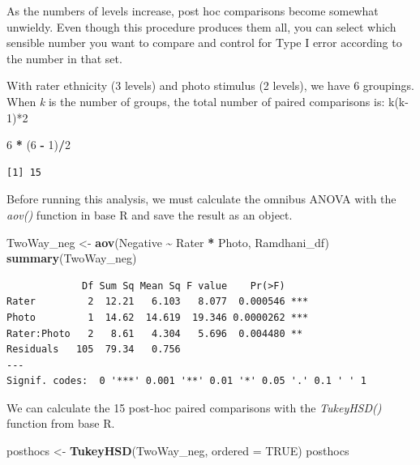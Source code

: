 \documentclass[
  11pt,
]{book}
\newenvironment{Shaded}{\begin{snugshade}}{\end{snugshade}}
\newcommand{\AttributeTok}[1]{\textcolor[rgb]{0.27,0.27,0.27}{#1}}
\newcommand{\ConstantTok}[1]{\textcolor[rgb]{0.37,0.37,0.37}{#1}}
\newcommand{\DecValTok}[1]{\textcolor[rgb]{0.06,0.06,0.06}{#1}}
\newcommand{\FunctionTok}[1]{\textcolor[rgb]{0.27,0.27,0.27}{\textbf{#1}}}
\newcommand{\NormalTok}[1]{#1}
\newcommand{\OtherTok}[1]{\textcolor[rgb]{0.37,0.37,0.37}{#1}}
\newcommand{\SpecialCharTok}[1]{\textcolor[rgb]{0.43,0.43,0.43}{\textbf{#1}}}
\begin{document}
As the numbers of levels increase, post hoc comparisons become somewhat unwieldy. Even though this procedure produces them all, you can select which sensible number you want to compare and control for Type I error according to the number in that set.

With rater ethnicity (3 levels) and photo stimulus (2 levels), we have 6 groupings. When \emph{k} is the number of groups, the total number of paired comparisons is: k(k-1)*2

\begin{Shaded}
\begin{Highlighting}[]
\DecValTok{6} \SpecialCharTok{*}\NormalTok{ (}\DecValTok{6} \SpecialCharTok{{-}} \DecValTok{1}\NormalTok{)}\SpecialCharTok{/}\DecValTok{2}
\end{Highlighting}
\end{Shaded}

\begin{verbatim}
[1] 15
\end{verbatim}

Before running this analysis, we must calculate the omnibus ANOVA with the \emph{aov()} function in base R and save the result as an object.

\begin{Shaded}
\begin{Highlighting}[]
\NormalTok{TwoWay\_neg }\OtherTok{\textless{}{-}} \FunctionTok{aov}\NormalTok{(Negative }\SpecialCharTok{\textasciitilde{}}\NormalTok{ Rater }\SpecialCharTok{*}\NormalTok{ Photo, Ramdhani\_df)}
\FunctionTok{summary}\NormalTok{(TwoWay\_neg)}
\end{Highlighting}
\end{Shaded}

\begin{verbatim}
             Df Sum Sq Mean Sq F value    Pr(>F)    
Rater         2  12.21   6.103   8.077  0.000546 ***
Photo         1  14.62  14.619  19.346 0.0000262 ***
Rater:Photo   2   8.61   4.304   5.696  0.004480 ** 
Residuals   105  79.34   0.756                      
---
Signif. codes:  0 '***' 0.001 '**' 0.01 '*' 0.05 '.' 0.1 ' ' 1
\end{verbatim}

We can calculate the 15 post-hoc paired comparisons with the \emph{TukeyHSD()} function from base R.

\begin{Shaded}
\begin{Highlighting}[]
\NormalTok{posthocs }\OtherTok{\textless{}{-}} \FunctionTok{TukeyHSD}\NormalTok{(TwoWay\_neg, }\AttributeTok{ordered =} \ConstantTok{TRUE}\NormalTok{)}
\NormalTok{posthocs}
\end{Highlighting}
\end{Shaded}
\end{document}
